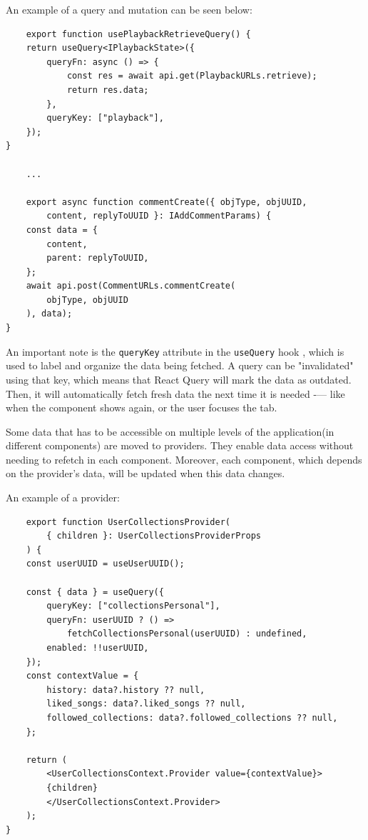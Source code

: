 An example of a query and mutation can be seen below:

\begin{verbatim}
    export function usePlaybackRetrieveQuery() {
    return useQuery<IPlaybackState>({
        queryFn: async () => {
            const res = await api.get(PlaybackURLs.retrieve);
            return res.data;
        },
        queryKey: ["playback"],
    });
}

    ...

    export async function commentCreate({ objType, objUUID,
        content, replyToUUID }: IAddCommentParams) {
    const data = {
        content,
        parent: replyToUUID,
    };
    await api.post(CommentURLs.commentCreate(
        objType, objUUID
    ), data);
}
\end{verbatim}


An important note is the \texttt{queryKey} attribute in the \texttt{useQuery} hook
, which is used to label and organize the data being fetched.
A query can be "invalidated" using that key, which means that React Query will mark the data as outdated.
Then, it will automatically fetch fresh data the next time it is needed -—
like when the component shows again, or the user focuses the tab.


Some data that has to be accessible on multiple levels of the application(in different components) are moved to
providers. They enable data access without needing to refetch in each component. Moreover, each component, which depends on the provider's data, will be updated when this data changes.

An example of a provider:

\begin{verbatim}
    export function UserCollectionsProvider(
        { children }: UserCollectionsProviderProps
    ) {
    const userUUID = useUserUUID();

    const { data } = useQuery({
        queryKey: ["collectionsPersonal"],
        queryFn: userUUID ? () =>
            fetchCollectionsPersonal(userUUID) : undefined,
        enabled: !!userUUID,
    });
    const contextValue = {
        history: data?.history ?? null,
        liked_songs: data?.liked_songs ?? null,
        followed_collections: data?.followed_collections ?? null,
    };

    return (
        <UserCollectionsContext.Provider value={contextValue}>
        {children}
        </UserCollectionsContext.Provider>
    );
}
\end{verbatim}

